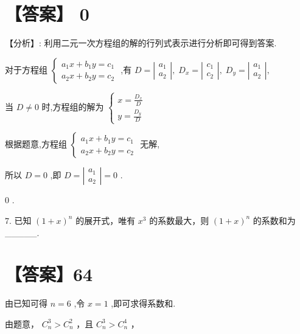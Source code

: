 \documentclass[10pt]{article}
\begin{document}
\section*{【答案】 0}

【分析】: 利用二元一次方程组的解的行列式表示进行分析即可得到答案.

对于方程组 \(\left\{  \begin{array}{l} {a}_{1}x + {b}_{1}y = {c}_{1} \\  {a}_{2}x + {b}_{2}y = {c}_{2} \end{array}\right.\) ,有 \(D = \left| \begin{array}{l} {a}_{1} \\  {a}_{2} \end{array}\right| ,\;{D}_{x} = \left| \begin{array}{l} {c}_{1} \\  {c}_{2} \end{array}\right| ,\;{D}_{y} = \left| \begin{array}{l} {a}_{1} \\  {a}_{2} \end{array}\right| ,\)

当 \(D \neq  0\) 时,方程组的解为 \(\left\{  \begin{array}{l} x = \frac{{D}_{x}}{D} \\  y = \frac{{D}_{y}}{D} \end{array}\right.\)

根据题意,方程组 \(\left\{  \begin{array}{l} {a}_{1}x + {b}_{1}y = {c}_{1} \\  {a}_{2}x + {b}_{2}y = {c}_{2} \end{array}\right.\) 无解,

所以 \(D = 0\) ,即 \(D = \left| \begin{array}{l} {a}_{1} \\  {a}_{2} \end{array}\right|  = 0\) .

0 .

7. 已知 \({\left( 1 + x\right) }^{n}\) 的展开式，唯有 \({x}^{3}\) 的系数最大，则 \({\left( 1 + x\right) }^{n}\) 的系数和为\_\_\_\_\_.

\section*{【答案】64}

由已知可得 \(n = 6\) ,令 \(x = 1\) ,即可求得系数和.

由题意， \({C}_{n}^{3} > {C}_{n}^{2}\) ，且 \({C}_{n}^{3} > {C}_{n}^{4}\) ，
\end{document}
